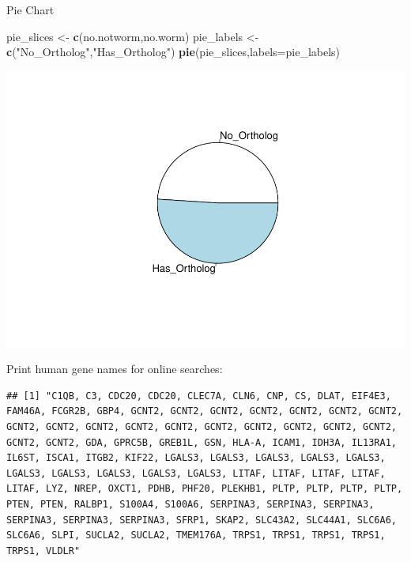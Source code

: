 \documentclass[
]{article}
\newenvironment{Shaded}{\begin{snugshade}}{\end{snugshade}}
\newcommand{\DataTypeTok}[1]{\textcolor[rgb]{0.13,0.29,0.53}{#1}}
\newcommand{\KeywordTok}[1]{\textcolor[rgb]{0.13,0.29,0.53}{\textbf{#1}}}
\newcommand{\NormalTok}[1]{#1}
\newcommand{\OperatorTok}[1]{\textcolor[rgb]{0.81,0.36,0.00}{\textbf{#1}}}
\newcommand{\StringTok}[1]{\textcolor[rgb]{0.31,0.60,0.02}{#1}}
\begin{document}
Pie Chart

\begin{Shaded}
\begin{Highlighting}[]
\NormalTok{pie_slices <-}\StringTok{ }\KeywordTok{c}\NormalTok{(no.notworm,no.worm)}
\NormalTok{pie_labels <-}\StringTok{ }\KeywordTok{c}\NormalTok{(}\StringTok{"No_Ortholog"}\NormalTok{,}\StringTok{"Has_Ortholog"}\NormalTok{)}
\KeywordTok{pie}\NormalTok{(pie_slices,}\DataTypeTok{labels=}\NormalTok{pie_labels)}
\end{Highlighting}
\end{Shaded}

\includegraphics{Thesis_DualCodeTest_files/figure-latex/unnamed-chunk-43-1.pdf}

Print human gene names for online searches:

\begin{Shaded}
\end{Shaded}

\begin{verbatim}
## [1] "C1QB, C3, CDC20, CDC20, CLEC7A, CLN6, CNP, CS, DLAT, EIF4E3, FAM46A, FCGR2B, GBP4, GCNT2, GCNT2, GCNT2, GCNT2, GCNT2, GCNT2, GCNT2, GCNT2, GCNT2, GCNT2, GCNT2, GCNT2, GCNT2, GCNT2, GCNT2, GCNT2, GCNT2, GCNT2, GCNT2, GDA, GPRC5B, GREB1L, GSN, HLA-A, ICAM1, IDH3A, IL13RA1, IL6ST, ISCA1, ITGB2, KIF22, LGALS3, LGALS3, LGALS3, LGALS3, LGALS3, LGALS3, LGALS3, LGALS3, LGALS3, LGALS3, LITAF, LITAF, LITAF, LITAF, LITAF, LYZ, NREP, OXCT1, PDHB, PHF20, PLEKHB1, PLTP, PLTP, PLTP, PLTP, PTEN, PTEN, RALBP1, S100A4, S100A6, SERPINA3, SERPINA3, SERPINA3, SERPINA3, SERPINA3, SERPINA3, SFRP1, SKAP2, SLC43A2, SLC44A1, SLC6A6, SLC6A6, SLPI, SUCLA2, SUCLA2, TMEM176A, TRPS1, TRPS1, TRPS1, TRPS1, TRPS1, VLDLR"
\end{verbatim}
\end{document}
